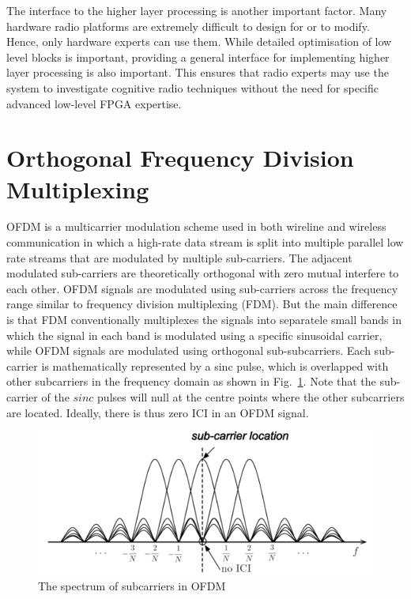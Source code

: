 The interface to the higher layer processing is another important factor. Many hardware radio platforms are extremely difficult to design for or to modify. Hence, only hardware experts can use them. While detailed optimisation of low level blocks is important, providing a general interface for implementing higher layer processing is also important. This ensures that radio experts may use the system to investigate cognitive radio techniques without the need for specific advanced low-level FPGA expertise.

\section{Orthogonal Frequency Division Multiplexing}

OFDM is a multicarrier modulation scheme used in both wireline and wireless communication in which a high-rate data stream is split into multiple parallel low rate streams that are modulated by multiple sub-carriers.
The adjacent modulated sub-carriers are theoretically orthogonal with zero mutual interfere to each other.
OFDM signals are modulated using sub-carriers across the frequency range similar to frequency division multiplexing (FDM). 
But the main difference is that FDM conventionally multiplexes the signals into separatele small bands in which the signal in each band is modulated using a specific sinusoidal carrier, while OFDM signals are modulated using orthogonal sub-subcarriers. 
Each sub-carrier is mathematically represented by a sinc pulse, which is overlapped with other subcarriers in the frequency domain as shown in Fig.~\ref{fig:OFDM-subcarrier}.
Note that the sub-carrier of the $sinc$ pulses will null at the centre points where the other subcarriers are located. Ideally, there is thus zero ICI in an OFDM signal. 

\begin{figure}
	\centerline{\includegraphics [width=0.8\columnwidth] {Figures/OFDM-subcarrier.pdf} }
	\caption{The spectrum of subcarriers in OFDM \cite{farhang2008signal}}
	\label{fig:OFDM-subcarrier}
\end{figure}

